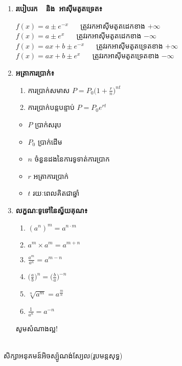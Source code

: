 \documentclass[12pt, a4paper]{article}
\begin{document}
\begin{enumerate}[m]
\begin{multicols}{3}
	\end{multicols}
	\item \textbf{\sffamily របៀបរក~~និង~អាស៊ីមតូតទ្រេត៖}
	\begin{center}
		$f(x)=a\pm e^{-x}$ ~~ ត្រូវរកអាស៊ីមតូតដេកខាង $+\infty$\\
		$f(x)=a\pm e^{x}$ ~~ ត្រូវរកអាស៊ីមតូតដេកខាង $-\infty$\\
		$f(x)=ax+b\pm e^{-x}$ ~~ ត្រូវរកអាស៊ីមតូតទ្រេតខាង $+\infty$\\
		$f(x)=ax+b\pm e^{x}$ ~~ ត្រូវរកអាស៊ីមតូតទ្រេតខាង $-\infty$
	\end{center}
	\item \textbf{\sffamily  អត្រាការប្រាក់៖}
		\begin{enumerate}[k]
			\item ការប្រាក់សមាស $P=P_0\bigg(1+\frac{r}{n}\bigg)^{nt}$
			\item ការប្រាក់បន្តបន្ទាប់ $P=P_0e^{rt}$
		\end{enumerate}
		\begin{multicols}{2}
			\begin{itemize}
				\item $P$ ប្រាក់សរុប
				\item $P_0$ ប្រាក់ដើម
				\item $n$ ចំនួនដងនៃការទូទាត់ការប្រាក
				\item $r$ អត្រាការប្រាក់ 
				\item $t$ រយៈពេលគិតជាឆ្នាំ
			\end{itemize}
		\end{multicols}
		\item \textbf{\sffamily លក្ខណៈទូទៅនៃស្វ័យគុណ៖}
		\begin{enumerate}[k, 3]
			\item $(a^n)^m=a^{n\cdot m}$
			\item $a^m\times a^m=a^{m+n}$
			\item $\frac{a^m}{a^n}=a^{m-n}$
			\item $\bigg(\frac{a}{b}\bigg)^n=\bigg(\frac{b}{a}\bigg)^{-n}$
			\item $\sqrt[n]{a^m}=a^{\frac{m}{n}}$
			\item $\frac{1}{a^n}=a^{-n}$
		\end{enumerate}
	\begin{center}
		\sffamily\color{black}
		សូមសំណាងល្អ!
	\end{center}
\end{enumerate}
\newpage
\begin{center}
	\sffamily\color{black}
	\\
	សិក្សាអនុគមន៍អិចស្ប៉ូណង់ស្យែល(រូបមន្តសុទ្ធ)
\end{center}
\end{document}
